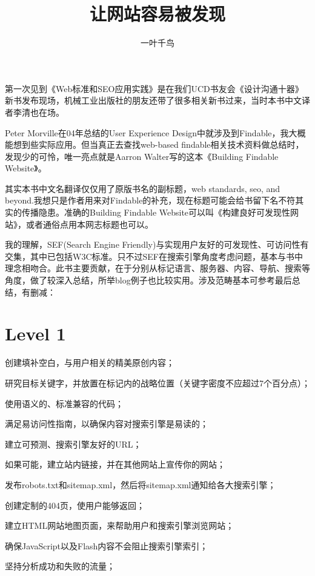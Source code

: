 \documentclass[11pt,adobefonts]{article} %
\title{让网站容易被发现}
\author{一叶千鸟}
\begin{document}
\maketitle



第一次见到《Web标准和SEO应用实践》是在我们UCD书友会《设计沟通十器》新书发布现场，机械工业出版社的朋友还带了很多相关新书过来，当时本书中文译者李清也在场。

Peter Morville在04年总结的User Experience Design中就涉及到Findable，我大概能想到些实际应用。但当真正去查找web-based findable相关技术资料做总结时，发现少的可怜，唯一亮点就是Aarron Walter写的这本《Building Findable Website》。

其实本书中文名翻译仅仅用了原版书名的副标题，web standards, seo, and beyond.我想只是作者用来对Findable的补充，现在标题可能会给书留下名不符其实的传播隐患。准确的Building Findable Website可以叫《构建良好可发现性网站》，或者通俗点用本网志标题也可以。

我的理解，SEF(Search Engine Friendly)与实现用户友好的可发现性、可访问性有交集，其中已包括W3C标准。只不过SEF在搜索引擎角度考虑问题，基本与书中理念相吻合。此书主要贡献，在于分别从标记语言、服务器、内容、导航、搜索等角度，做了较深入总结，所举blog例子也比较实用。涉及范畴基本可参考最后总结，有删减： 

\section{Level 1}


\begin{compactenum}
\item 创建填补空白，与用户相关的精美原创内容；
\item 研究目标关键字，并放置在标记内的战略位置（关键字密度不应超过7个百分点）；
\item 使用语义的、标准兼容的代码；
\item 满足易访问性指南，以确保内容对搜索引擎是易读的；
\item 建立可预测、搜索引擎友好的URL；
\item 如果可能，建立站内链接，并在其他网站上宣传你的网站；
\item 发布robots.txt和sitemap.xml，然后将sitemap.xml通知给各大搜索引擎；
\item 创建定制的404页，使用户能够返回；
\item 建立HTML网站地图页面，来帮助用户和搜索引擎浏览网站；
\item 确保JavaScript以及Flash内容不会阻止搜索引擎索引；
\item 坚持分析成功和失败的流量；
\end{compactenum}
\end{document}

